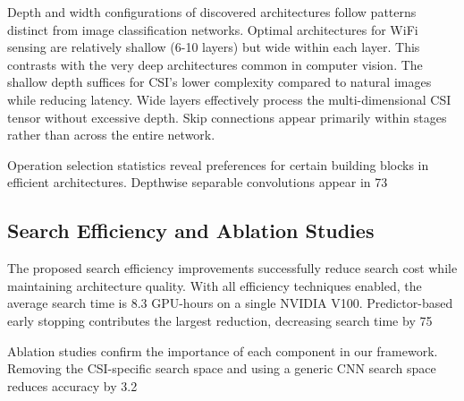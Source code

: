 \documentclass[journal]{IEEEtran}
\begin{document}
Depth and width configurations of discovered architectures follow patterns distinct from image classification networks. Optimal architectures for WiFi sensing are relatively shallow (6-10 layers) but wide within each layer. This contrasts with the very deep architectures common in computer vision. The shallow depth suffices for CSI's lower complexity compared to natural images while reducing latency. Wide layers effectively process the multi-dimensional CSI tensor without excessive depth. Skip connections appear primarily within stages rather than across the entire network.

Operation selection statistics reveal preferences for certain building blocks in efficient architectures. Depthwise separable convolutions appear in 73%

\subsection{Search Efficiency and Ablation Studies}

The proposed search efficiency improvements successfully reduce search cost while maintaining architecture quality. With all efficiency techniques enabled, the average search time is 8.3 GPU-hours on a single NVIDIA V100. Predictor-based early stopping contributes the largest reduction, decreasing search time by 75%

Ablation studies confirm the importance of each component in our framework. Removing the CSI-specific search space and using a generic CNN search space reduces accuracy by 3.2%
\end{document}
